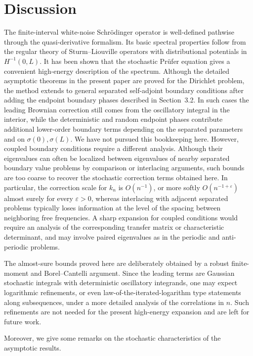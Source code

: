 \documentclass[11pt]{article}
\begin{document}
\section{Discussion}

The finite-interval white-noise Schr\"odinger operator is well-defined pathwise through the quasi-derivative formalism. Its basic spectral properties follow from the regular theory of Sturm--Liouville operators with distributional potentials in \(H^{-1}(0,L)\). It has been shown that the stochastic Pr\"ufer equation gives a convenient high-energy description of the spectrum. Although the detailed asymptotic theorems in the present paper are proved for the Dirichlet problem, the method extends to general separated self-adjoint boundary conditions after adding the endpoint boundary phases described in Section~3.2. In such cases the leading Brownian correction still comes from the oscillatory integral in the interior, while the deterministic and random endpoint phases contribute additional lower-order boundary terms depending on the separated parameters and on $\sigma(0),\sigma(L)$. We have not pursued this bookkeeping here. However, coupled boundary conditions require a different analysis. Although their eigenvalues can often be localized between eigenvalues of nearby separated boundary value problems by comparison or interlacing arguments, such bounds are too coarse to recover the stochastic correction terms obtained here. In particular, the correction scale for \(k_n\) is \(O(n^{-1})\), or more softly \(O(n^{-1+\varepsilon})\) almost surely for every \(\varepsilon>0\), whereas interlacing with adjacent separated problems typically loses information at the level of the spacing between neighboring free frequencies. A sharp expansion for coupled conditions would require an analysis of the corresponding transfer matrix or characteristic determinant, and may involve paired eigenvalues as in the periodic and anti-periodic problems.

The almost-sure bounds proved here are deliberately obtained by a robust finite-moment and Borel--Cantelli argument. Since the leading terms are Gaussian stochastic integrals with deterministic oscillatory integrands, one may expect logarithmic refinements, or even law-of-the-iterated-logarithm type statements along subsequences, under a more detailed analysis of the correlations in $n$. Such refinements are not needed for the present high-energy expansion and are left for future work.

Moreover, we give some remarks on the stochastic characteristics of the asymptotic results.
\end{document}
